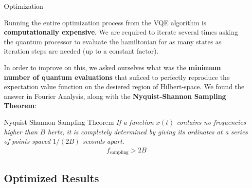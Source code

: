 \documentclass[9pt, handout, aspectratio=169]{beamer}		%
\begin{document}
\begin{frame}{Optimization}

	Running the entire optimization process from the VQE algorithm is \textbf{computationally expensive}. We are required to iterate several times asking the quantum processor to evaluate the hamiltonian for as many states as iteration steps are needed (up to a constant factor).

	\medskip

	In order to improve on this, we asked ourselves what was the \textbf{minimum number of quantum evaluations} that suficed to perfectly reproduce the expectation value function on the desiered region of Hilbert-space. We found the answer in Fourier Analysis, along with the \textbf{Nyquist-Shannon Sampling Theorem}:

	\begin{block}{Nyquist-Shannon Sampling Theorem}
		\emph{If a function $x(t)$ contains no frequencies higher than $B$ hertz, it is completely determined by giving its ordinates at a series of points spaced $1/(2B)$ seconds apart.}
		\medskip
		\begin{align*}
			f_{\text{sampling}} > 2B
		\end{align*}
	\end{block}

\end{frame}


	\subsection{Optimized Results}
\end{document}
